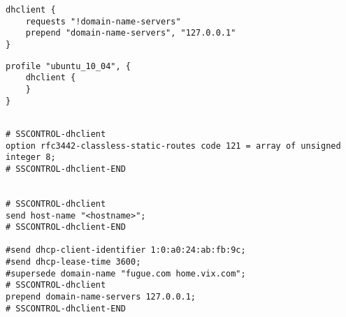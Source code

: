 
\begin{lstlisting}[style=Java,label=lst:dhclient_example_script,
title={Example script for the Dhclient service. It will remove the domain name servers from the DHCP request and use the DNS server on the localhost.}]
dhclient {
    requests "!domain-name-servers"
    prepend "domain-name-servers", "127.0.0.1"
}
\end{lstlisting}

\begin{lstlisting}[style=Java,label=lst:dhclient_ubuntu_profile_min,
title={Minimal Ubuntu Dhclient profile, all needed profile properties are already set to sensible default values.}]
profile "ubuntu_10_04", {
    dhclient {
    }
}
\end{lstlisting}

\begin{lstlisting}[style=rcfile_nonumbers,
label=lst:dhclient_maincf_example,
title={Example of the DHCP configuration file that is created from the Dhclient profile.
The file is saved as /etc/dhcp3/dhclient.conf}]
  
# SSCONTROL-dhclient                                                                                                                                                 
option rfc3442-classless-static-routes code 121 = array of unsigned integer 8;
# SSCONTROL-dhclient-END                                                                                                                                             


# SSCONTROL-dhclient                                                                                                                                                 
send host-name "<hostname>";
# SSCONTROL-dhclient-END                                                                                                                                             

#send dhcp-client-identifier 1:0:a0:24:ab:fb:9c;                                                                                                                     
#send dhcp-lease-time 3600;                                                                                                                                          
#supersede domain-name "fugue.com home.vix.com";                                                                                                                     
# SSCONTROL-dhclient                                                                                                                                                 
prepend domain-name-servers 127.0.0.1;
# SSCONTROL-dhclient-END                                                                                                                                             


\end{lstlisting}

